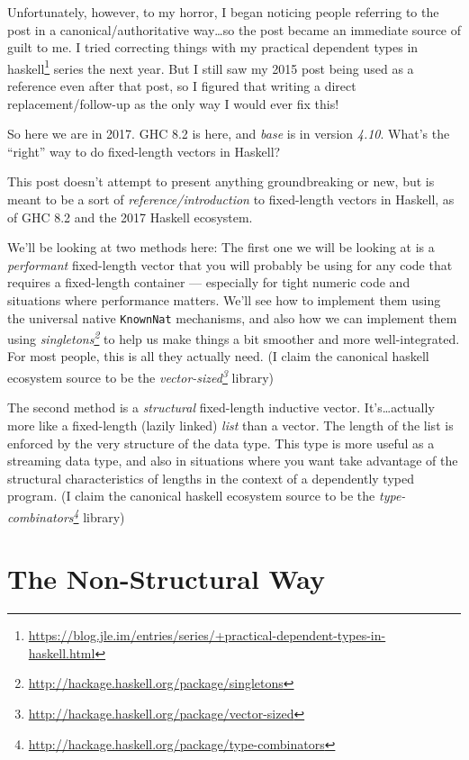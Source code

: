 \documentclass[]{article}
\renewcommand{\href}[2]{#2\footnote{\url{#1}}}
\begin{document}
Unfortunately, however, to my horror, I began noticing people referring to the
post in a canonical/authoritative way\ldots so the post became an immediate
source of guilt to me. I tried correcting things with my
\href{https://blog.jle.im/entries/series/+practical-dependent-types-in-haskell.html}{practical
dependent types in haskell} series the next year. But I still saw my 2015 post
being used as a reference even after that post, so I figured that writing a
direct replacement/follow-up as the only way I would ever fix this!

So here we are in 2017. GHC 8.2 is here, and \emph{base} is in version
\emph{4.10}. What's the ``right'' way to do fixed-length vectors in Haskell?

This post doesn't attempt to present anything groundbreaking or new, but is
meant to be a sort of \emph{reference/introduction} to fixed-length vectors in
Haskell, as of GHC 8.2 and the 2017 Haskell ecosystem.

We'll be looking at two methods here: The first one we will be looking at is a
\emph{performant} fixed-length vector that you will probably be using for any
code that requires a fixed-length container --- especially for tight numeric
code and situations where performance matters. We'll see how to implement them
using the universal native \texttt{KnownNat} mechanisms, and also how we can
implement them using
\emph{\href{http://hackage.haskell.org/package/singletons}{singletons}} to help
us make things a bit smoother and more well-integrated. For most people, this is
all they actually need. (I claim the canonical haskell ecosystem source to be
the \emph{\href{http://hackage.haskell.org/package/vector-sized}{vector-sized}}
library)

The second method is a \emph{structural} fixed-length inductive vector.
It's\ldots actually more like a fixed-length (lazily linked) \emph{list} than a
vector. The length of the list is enforced by the very structure of the data
type. This type is more useful as a streaming data type, and also in situations
where you want take advantage of the structural characteristics of lengths in
the context of a dependently typed program. (I claim the canonical haskell
ecosystem source to be the
\emph{\href{http://hackage.haskell.org/package/type-combinators}{type-combinators}}
library)

\section{The Non-Structural Way}\label{the-non-structural-way}
\end{document}
